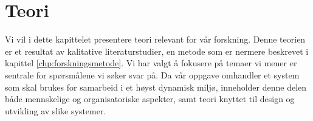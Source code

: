 \chapter{Teori}
\label{chp:teori}


Vi vil i dette kapittelet presentere teori relevant for vår forskning. Denne teorien er et resultat av kalitative literaturstudier, en metode som er nermere beskrevet i kapittel \ref{chp:forskningsmetode}. Vi har valgt å fokusere på temaer vi mener er sentrale for spørsmålene vi søker svar på. Da vår oppgave omhandler et system som skal brukes for samarbeid i et høyst dynamisk miljø, inneholder denne delen  både mennskelige og organisatoriske aspekter, samt teori knyttet til design og utvikling av slike systemer.
